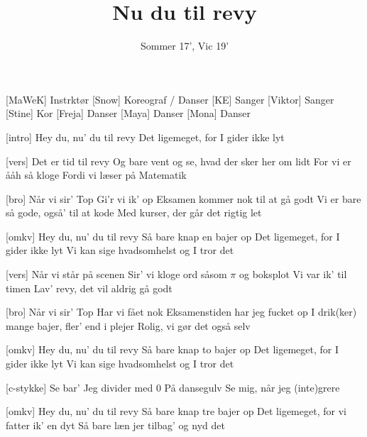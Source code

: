 \documentclass[a4paper,11pt]{article}
\title{Nu du til revy}
\author{Sommer 17', Vic 19'}
\begin{document}
\maketitle

\begin{roles}
[MaWeK] Instrktør
[Snow] Koreograf / Danser
[KE] Sanger
[Viktor] Sanger
[Stine] Kor
[Freja] Danser
[Maya] Danser
[Mona] Danser
\end{roles}

\begin{song}
  [intro]%
  Hey du, nu' du til revy
  Det ligemeget, for I gider ikke lyt

  [vers]%
  Det er tid til revy
Og bare vent og se, hvad der sker her om lidt
For vi er ååh så kloge
Fordi vi læser på Matematik 

[bro]%
Når vi sir' Top
Gi'r vi ik' op
Eksamen kommer nok til at gå godt 
Vi er bare så gode, også' til at kode 
Med kurser, der går det rigtig let

[omkv]%
Hey du, nu' du til revy
Så bare knap en bajer op 
Det ligemeget, for I gider ikke lyt
Vi kan sige hvadsomhelst og I tror det 

[vers]%
Når vi står på scenen
Sir' vi kloge ord såsom $\pi$ og boksplot
Vi var ik' til timen
Lav' revy, det vil aldrig gå godt 

[bro]%
Når vi sir' Top
Har vi fået nok
Eksamenstiden har jeg fucket op
I drik(ker) mange bajer, fler' end i plejer
Rolig, vi gør det også selv 

[omkv]%
Hey du, nu' du til revy
Så bare knap to bajer op 
Det ligemeget, for I gider ikke lyt
Vi kan sige hvadsomhelst og I tror det 

[c-stykke]%
Se bar'
Jeg divider med $0$
På dansegulv
Se mig, når jeg (inte)grere  

[omkv]%
Hey du, nu' du til revy
Så bare knap tre bajer op 
Det ligemeget, for vi fatter ik' en dyt
Så bare læn jer tilbag' og nyd det

\end{song}
\end{document}
